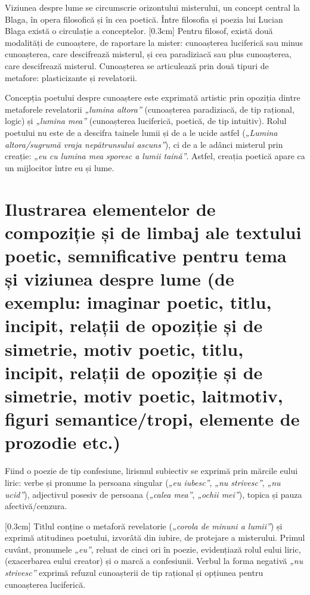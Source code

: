 \documentclass[
12pt,                        %
a4paper                      %
]{article}
\newcommand{\rom}[1]{\uppercase\expandafter{\romannumeral #1\relax}} %
\begin{document}
Viziunea despre lume se circumscrie orizontului misterului, un concept central la Blaga, în opera filosofică și în cea poetică. Între filosofia și poezia lui Lucian Blaga există o circulație a conceptelor.
[0.3cm]
Pentru filosof, există două modalități de cunoaștere, de raportare la mister: cunoașterea luciferică sau minus cunoașterea, care descifrează misterul, și cea paradiziacă sau plus cunoașterea, care descifrează misterul. Cunoașterea se articulează prin două tipuri de metafore: plasticizante și revelatorii.

Concepția poetului despre cunoaștere este exprimată artistic prin opoziția dintre metaforele revelatorii \textit{„lumina altora”} (cunoașterea paradiziacă, de tip rațional, logic) și \textit{„lumina mea”} (cunoașterea luciferică, poetică, de tip intuitiv). Rolul poetului nu este de a descifra tainele lumii și de a le ucide astfel (\textit{„Lumina altora/sugrumă vraja nepătrunsului ascuns”}), ci de a le adânci misterul prin creație: \textit{„eu cu lumina mea sporesc a lumii taină”}. Astfel, creația poetică apare ca un mijlocitor între eu și lume.

\section{Ilustrarea elementelor de compoziție și de limbaj ale textului poetic, semnificative pentru tema și viziunea despre lume {\footnotesize (de exemplu: imaginar poetic, titlu, incipit, relații de opoziție și de simetrie, motiv poetic, titlu, incipit, relații de opoziție și de simetrie, motiv poetic, laitmotiv, figuri semantice/tropi, elemente de prozodie etc.)}}

Fiind o poezie de tip confesiune, lirismul subiectiv se exprimă prin mărcile eului liric: verbe și pronume la persoana \rom{1} singular (\textit{„eu iubesc”}, \textit{„nu strivesc”}, \textit{„nu ucid”}), adjectivul posesiv de persoana \rom{1} (\textit{„calea mea”}, \textit{„ochii mei”}), topica și pauza afectivă/cenzura.

[0.3cm]
Titlul conține o metaforă revelatorie (\textit{„corola de minuni a lumii”}) și exprimă atitudinea poetului, izvorâtă din iubire, de protejare a misterului. Primul cuvânt, pronumele \textit{„eu”}, reluat de cinci ori în poezie, evidențiază rolul eului liric, (exacerbarea eului creator) și o marcă a confesiunii. Verbul la forma negativă \textit{„nu strivesc”} exprimă refuzul cunoașterii de tip rațional și opțiunea pentru cunoașterea luciferică.
\end{document}

